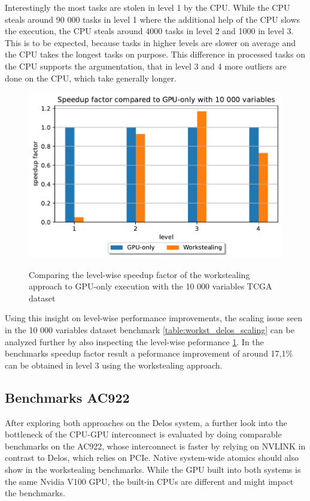 Interestingly the most tasks are stolen in level 1 by the CPU. While the CPU steals around 90 000 tasks in level 1 where the additional help of the CPU slows the execution, the CPU steals around 4000 tasks in level 2 and 1000 in level 3. This is to be expected, because tasks in higher levels are slower on average and the CPU takes the longest tasks on purpose. This difference in processed tasks on the CPU supports the argumentation, that in level 3 and 4 more outliers are done on the CPU, which take generally longer.

\begin{figure}[H]
  \caption{Comparing the level-wise speedup factor of the workstealing approach to GPU-only execution with the 10 000 variables TCGA dataset}
  \includegraphics[width=\textwidth]{figures/levelwise_scaled.pdf}
  \centering
  \label{fig:levelwise_scaled_delos}
\end{figure}


Using this insight on level-wise performance improvements, the scaling issue seen in the 10 000 variables dataset benchmark \ref{table:workst_delos_scaling} can be analyzed further by also inspecting the level-wise peformance \ref{fig:levelwise_scaled_delos}. In the benchmarks speedup factor result a peformance improvement of around 17,1\% can be obtained in level 3 using the workstealing approach.


\subsection{Benchmarks AC922}
After exploring both approaches on the Delos system, a further look into the bottleneck of the CPU-GPU interconnect is evaluated by doing comparable benchmarks on the AC922, whose interconnect is faster by relying on NVLINK in contrast to Delos, which relies on PCIe. Native system-wide atomics should also show in the workstealing benchmarks.
While the GPU built into both systems is the same Nvidia V100 GPU, the built-in CPUs are different and might impact the benchmarks.

